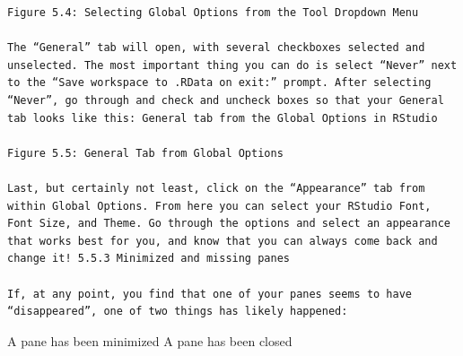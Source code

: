 \documentclass[
  letterpaper,
  DIV=11,
  numbers=noendperiod]{scrreprt}
\begin{document}
\begin{verbatim}
Figure 5.4: Selecting Global Options from the Tool Dropdown Menu

The “General” tab will open, with several checkboxes selected and unselected. The most important thing you can do is select “Never” next to the “Save workspace to .RData on exit:” prompt. After selecting “Never”, go through and check and uncheck boxes so that your General tab looks like this: General tab from the Global Options in RStudio

Figure 5.5: General Tab from Global Options

Last, but certainly not least, click on the “Appearance” tab from within Global Options. From here you can select your RStudio Font, Font Size, and Theme. Go through the options and select an appearance that works best for you, and know that you can always come back and change it! 5.5.3 Minimized and missing panes

If, at any point, you find that one of your panes seems to have “disappeared”, one of two things has likely happened:
\end{verbatim}

A pane has been minimized A pane has been closed
\end{document}
